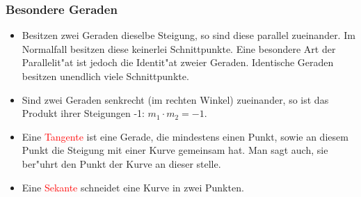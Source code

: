 \subsubsection{Besondere Geraden}
\begin{itemize}
\item Besitzen zwei Geraden dieselbe Steigung, so sind diese parallel zueinander. Im Normalfall besitzen diese keinerlei Schnittpunkte. Eine besondere Art der Parallelit"at ist jedoch die Identit"at zweier Geraden. Identische Geraden besitzen unendlich viele Schnittpunkte.
\item Sind zwei Geraden senkrecht (im rechten Winkel) zueinander, so ist das Produkt ihrer Steigungen -1: $m_1 \cdot m_2 = -1$.
\item Eine  \textcolor{red}{Tangente} ist eine Gerade, die mindestens einen Punkt, sowie an diesem Punkt die Steigung mit einer Kurve gemeinsam hat. Man sagt auch, sie ber"uhrt den Punkt der Kurve an dieser stelle.
\item Eine  \textcolor{red}{Sekante} schneidet eine Kurve in zwei Punkten.
\end{itemize}